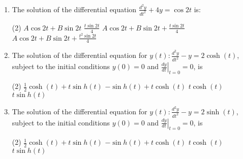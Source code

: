 \begin{enumerate}
\begin{tasks}
	\end{tasks}
	\item The solution of the differential equation $\frac{d^{2} y}{d t^{2}}+4 y=\cos 2 t$ is:
	 \begin{tasks}(2)
		\task[\textbf{a.}] $A \cos 2 t+B \sin 2 t$
		\task[\textbf{b.}] $\frac{t \sin 2 t}{4}$
		\task[\textbf{c.}]$A \cos 2 t+B \sin 2 t+\frac{t \sin 2 t}{4}$
		\task[\textbf{d.}] $A \cos 2 t+B \sin 2 t+\frac{t^{2} \sin 2 t}{4}$
	\end{tasks}
	\item The solution of the differential equation for $y(t): \frac{d^{2} y}{d t^{2}}-y=2 \cosh (t)$, subject to the initial conditions $y(0)=0$ and $\left.\frac{d y}{d t}\right|_{t=0}=0$, is
	 \begin{tasks}(2)
		\task[\textbf{a.}]$\frac{1}{2} \cosh (t)+t \sin h(t)$
		\task[\textbf{b.}]$-\sin h(t)+t \cosh (t)$
		\task[\textbf{c.}] $t \cosh (t)$
		\task[\textbf{d.}] $t \sin h(t)$
	\end{tasks}
	\item The solution of the differential equation for $y(t): \frac{d^{2} y}{d t^{2}}-y=2 \sinh (t)$, subject to the initial conditions $y(0)=0$ and $\left.\frac{d y}{d t}\right|_{t=0}=0$, is
	 \begin{tasks}(2)
		\task[\textbf{a.}] $\frac{1}{2} \cosh (t)+t \sin h(t)$
		\task[\textbf{b.}]$-\sin h(t)+t \cosh (t)$
		\task[\textbf{c.}]$t \cosh (t)$
		\task[\textbf{d.}] $t \sin h(t)$
	\end{tasks}
\end{enumerate}
